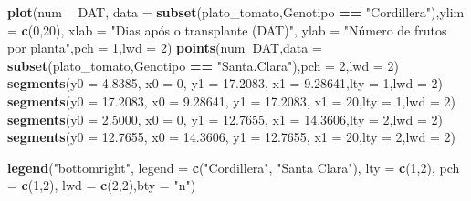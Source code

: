 \documentclass[
]{book}
\newenvironment{Shaded}{\begin{snugshade}}{\end{snugshade}}
\newcommand{\DataTypeTok}[1]{\textcolor[rgb]{0.13,0.29,0.53}{#1}}
\newcommand{\DecValTok}[1]{\textcolor[rgb]{0.00,0.00,0.81}{#1}}
\newcommand{\FloatTok}[1]{\textcolor[rgb]{0.00,0.00,0.81}{#1}}
\newcommand{\KeywordTok}[1]{\textcolor[rgb]{0.13,0.29,0.53}{\textbf{#1}}}
\newcommand{\NormalTok}[1]{#1}
\newcommand{\OperatorTok}[1]{\textcolor[rgb]{0.81,0.36,0.00}{\textbf{#1}}}
\newcommand{\StringTok}[1]{\textcolor[rgb]{0.31,0.60,0.02}{#1}}
\begin{document}
\begin{Shaded}
\begin{Highlighting}[]
\KeywordTok{plot}\NormalTok{(num }\OperatorTok{~}\StringTok{ }\NormalTok{DAT,}
     \DataTypeTok{data =} \KeywordTok{subset}\NormalTok{(plato_tomato,Genotipo }\OperatorTok{==}\StringTok{ "Cordillera"}\NormalTok{),}\DataTypeTok{ylim =} \KeywordTok{c}\NormalTok{(}\DecValTok{0}\NormalTok{,}\DecValTok{20}\NormalTok{),}
     \DataTypeTok{xlab =} \StringTok{"Dias após o transplante (DAT)"}\NormalTok{,}
     \DataTypeTok{ylab =} \StringTok{"Número de frutos por planta"}\NormalTok{,}\DataTypeTok{pch =} \DecValTok{1}\NormalTok{,}\DataTypeTok{lwd =} \DecValTok{2}\NormalTok{)}
\KeywordTok{points}\NormalTok{(num}\OperatorTok{~}\NormalTok{DAT,}\DataTypeTok{data =} \KeywordTok{subset}\NormalTok{(plato_tomato,Genotipo }\OperatorTok{==}\StringTok{ "Santa.Clara"}\NormalTok{),}\DataTypeTok{pch =} \DecValTok{2}\NormalTok{,}\DataTypeTok{lwd =} \DecValTok{2}\NormalTok{)}
\KeywordTok{segments}\NormalTok{(}\DataTypeTok{y0 =} \FloatTok{4.8385}\NormalTok{, }\DataTypeTok{x0 =} \DecValTok{0}\NormalTok{, }\DataTypeTok{y1 =} \FloatTok{17.2083}\NormalTok{, }\DataTypeTok{x1 =} \FloatTok{9.28641}\NormalTok{,}\DataTypeTok{lty =} \DecValTok{1}\NormalTok{,}\DataTypeTok{lwd =} \DecValTok{2}\NormalTok{)}
\KeywordTok{segments}\NormalTok{(}\DataTypeTok{y0 =} \FloatTok{17.2083}\NormalTok{, }\DataTypeTok{x0 =} \FloatTok{9.28641}\NormalTok{, }\DataTypeTok{y1 =} \FloatTok{17.2083}\NormalTok{, }\DataTypeTok{x1 =} \DecValTok{20}\NormalTok{,}\DataTypeTok{lty =} \DecValTok{1}\NormalTok{,}\DataTypeTok{lwd =} \DecValTok{2}\NormalTok{)}
\KeywordTok{segments}\NormalTok{(}\DataTypeTok{y0 =} \FloatTok{2.5000}\NormalTok{, }\DataTypeTok{x0 =} \DecValTok{0}\NormalTok{, }\DataTypeTok{y1 =} \FloatTok{12.7655}\NormalTok{, }\DataTypeTok{x1 =} \FloatTok{14.3606}\NormalTok{,}\DataTypeTok{lty =} \DecValTok{2}\NormalTok{,}\DataTypeTok{lwd =} \DecValTok{2}\NormalTok{)}
\KeywordTok{segments}\NormalTok{(}\DataTypeTok{y0 =} \FloatTok{12.7655}\NormalTok{, }\DataTypeTok{x0 =} \FloatTok{14.3606}\NormalTok{, }\DataTypeTok{y1 =} \FloatTok{12.7655}\NormalTok{, }\DataTypeTok{x1 =} \DecValTok{20}\NormalTok{,}\DataTypeTok{lty =} \DecValTok{2}\NormalTok{,}\DataTypeTok{lwd =} \DecValTok{2}\NormalTok{)}


\KeywordTok{legend}\NormalTok{(}\StringTok{"bottomright"}\NormalTok{, }\DataTypeTok{legend =} \KeywordTok{c}\NormalTok{(}\StringTok{"Cordillera"}\NormalTok{, }\StringTok{"Santa Clara"}\NormalTok{), }\DataTypeTok{lty =} \KeywordTok{c}\NormalTok{(}\DecValTok{1}\NormalTok{,}\DecValTok{2}\NormalTok{),}
       \DataTypeTok{pch =} \KeywordTok{c}\NormalTok{(}\DecValTok{1}\NormalTok{,}\DecValTok{2}\NormalTok{), }\DataTypeTok{lwd =} \KeywordTok{c}\NormalTok{(}\DecValTok{2}\NormalTok{,}\DecValTok{2}\NormalTok{),}\DataTypeTok{bty =} \StringTok{"n"}\NormalTok{)}
\end{Highlighting}
\end{Shaded}
\end{document}
